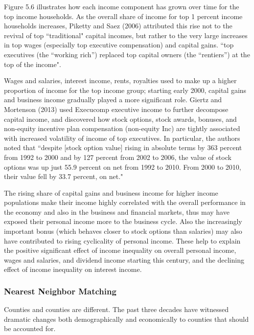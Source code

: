 \documentclass{article}
\begin{document}
Figure 5.6 illustrates how each income component has grown over time for the top income households. As the overall share of income for top 1 percent income households increases, Piketty and Saez (2006) attributed this rise not to the revival of top ``traditional" capital incomes, but rather to the very large increases in top wages (especially top executive compensation) and capital gains. ``top executives (the “working rich”) replaced top capital
owners (the “rentiers”) at the top of the income". 

Wages and salaries, interest income, rents, royalties used to make up a higher proportion of income for the top income group; starting early 2000, capital gains and business income gradually played a more significant role. Giertz and Mortenson (2013) used Execucomp executive income to further decompose capital income, and discovered how stock options, stock awards, bonuses, and non-equity incentive plan compensation (non-equity Inc) are tightly associated with increased volatility of income of top executives. In particular, the authors noted that ``despite [stock option value] rising in absolute terms by 363 percent from 1992 to 2000 and by 127 percent from 2002 to 2006, the value of stock options was up just 55.9 percent on net from 1992 to 2010. From 2000 to 2010, their value fell by 33.7 percent, on net." 

The rising share of capital gains and business income for higher income populations make their income highly correlated with the overall performance in the economy and also in the business and financial markets, thus may have exposed their personal income more to the business cycle. Also the increasingly important bonus (which behaves closer to stock options than salaries) may also have contributed to rising cyclicality of personal income. These help to explain the positive significant effect of income inequality on overall personal income, wages and salaries, and dividend income starting this century, and the declining effect of income inequality on interest income. 


\pagebreak






\subsubsection{Nearest Neighbor Matching}

Counties and counties are different. The past three decades have witnessed dramatic changes both demographically and economically to counties that should be accounted for. 
\end{document}
